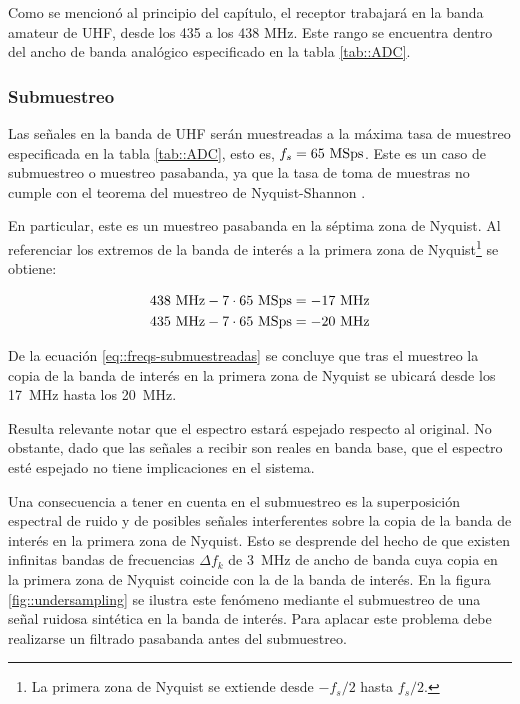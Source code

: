 \documentclass[../../main.tex]{subfiles}
\begin{document}
Como se mencionó al principio del capítulo, el receptor trabajará en la banda amateur de UHF, desde los 435 a los 438 MHz. Este rango se encuentra dentro del ancho de banda analógico especificado en la tabla \ref{tab::ADC}.


\subsubsection{Submuestreo}
Las señales en la banda de UHF serán muestreadas a la máxima tasa de muestreo especificada en la tabla \ref{tab::ADC}, esto es, $f_s = 65~\textrm{MSps}$. Este es un caso de submuestreo o muestreo pasabanda, ya que la tasa de toma de muestras no cumple con el teorema del muestreo de Nyquist-Shannon \cite{teorema-del-muestreo}.

En particular, este es un muestreo pasabanda en la séptima zona de Nyquist. Al referenciar los extremos de la banda de interés a la primera zona de Nyquist\footnote{La primera zona de Nyquist se extiende desde $-f_s/2$ hasta $f_s/2$.} se obtiene:

\begin{equation}
\!
\begin{aligned}
438~\textrm{MHz} - 7 \cdot 65~\textrm{MSps} = -17~\textrm{MHz} \\
435~\textrm{MHz} - 7 \cdot 65~\textrm{MSps} = -20~\textrm{MHz} 
\end{aligned}
\label{eq::freqs-submuestreadas}
\end{equation}

De la ecuación \ref{eq::freqs-submuestreadas} se concluye que tras el muestreo la copia de la banda de interés en la primera zona de Nyquist se ubicará desde los 17~MHz hasta los 20~MHz. 

Resulta relevante notar que el espectro estará espejado respecto al original. No obstante, dado que las señales a recibir son reales en banda base, que el espectro esté espejado no tiene implicaciones en el sistema.  

Una consecuencia a tener en cuenta en el submuestreo es la superposición espectral de ruido y de posibles señales interferentes sobre la copia de la banda de interés en la primera zona de Nyquist. Esto se desprende del hecho de que existen infinitas bandas de frecuencias $\Delta f_k$ de 3~MHz de ancho de banda cuya copia en la primera zona de Nyquist coincide con la de la banda de interés. 
En la figura \ref{fig::undersampling} se ilustra este fenómeno mediante el submuestreo de una señal ruidosa sintética en la banda de interés. Para aplacar este problema debe realizarse un filtrado pasabanda antes del submuestreo.
\end{document}
